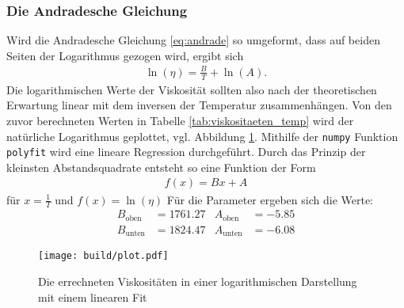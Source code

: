 

\subsubsection[]{Die Andradesche Gleichung}
Wird die Andradesche Gleichung \eqref{eq:andrade} so umgeformt, dass auf beiden Seiten der Logarithmus gezogen wird, ergibt sich
\begin{align}
    \ln {\left( \eta \right)} = \frac{B}{T} + \ln{\left( A \right)}.
\end{align}
Die logarithmischen Werte der Viskosität sollten also nach der theoretischen Erwartung linear mit dem inversen der Temperatur zusammenhängen.
Von den zuvor berechneten Werten in Tabelle \ref{tab:viskositaeten_temp} wird der natürliche Logarithmus geplottet, vgl. Abbildung \ref{fig:groKu_steigendeTemp_eta_fit}.
Mithilfe der \texttt{numpy} \cite[]{numpy} Funktion \texttt{polyfit} wird eine lineare Regression durchgeführt.
Durch das Prinzip der kleinsten Abstandsquadrate entsteht so eine Funktion der Form
\begin{align*}
    f(x) = B x + A 
\end{align*}
für $x= \frac{1}{T}$ und $f(x)= \ln (\eta)$
Für die Parameter ergeben sich die Werte:
\begin{align*}
    B_\text{oben} &= \num{1761.27} & A_\text{oben} &= \num{-5.85} \\
    B_\text{unten} &= \num{1824.47} & A_\text{unten} &= \num{-6.08}
\end{align*}
%
\begin{figure}[H]
    \centering
    \texttt{[image: build/plot.pdf]}
    \caption{Die errechneten Viskositäten in einer logarithmischen Darstellung mit einem linearen Fit}
    \label{fig:groKu_steigendeTemp_eta_fit}
\end{figure}
%


